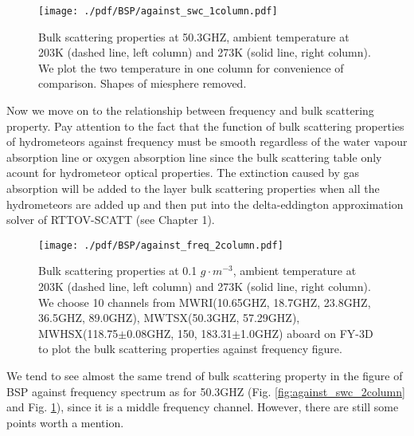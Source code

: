 \documentclass[a4paper]{report}
\begin{document}
\begin{figure}[hbtp] 
\centering
\texttt{[image: ./pdf/BSP/against\_swc\_1column.pdf]}
\caption{Bulk scattering properties at 50.3GHZ, ambient temperature at 203K (dashed line, left column) and 273K (solid line, right column).
We plot the two temperature in one column for convenience of comparison. Shapes of miesphere removed.}
\label{fig:against_swc_1column}
\end{figure}


Now we move on to the relationship between frequency and bulk scattering property. Pay attention to the fact that the function of bulk scattering properties 
of hydrometeors against frequency must be smooth regardless of the water vapour absorption line or oxygen absorption line
since the bulk scattering table only acount for hydrometeor optical properties. The extinction caused by gas absorption will be added to the layer bulk scattering properties
when all the hydrometeors are added up and then put into the delta-eddington approximation solver of RTTOV-SCATT (see Chapter 1).   

\begin{figure}[hbtp] 
\centering
\texttt{[image: ./pdf/BSP/against\_freq\_2column.pdf]}
\caption{Bulk scattering properties at 0.1 $g \cdot m^{-3}$, ambient temperature at 203K (dashed line, left column) and 273K (solid line, right column).
We choose 10 channels from MWRI(10.65GHZ, 18.7GHZ, 23.8GHZ, 36.5GHZ, 89.0GHZ), MWTSX(50.3GHZ, 57.29GHZ), MWHSX(118.75$\pm$0.08GHZ, 150, 183.31$\pm$1.0GHZ) aboard on FY-3D
to plot the bulk scattering properties against frequency figure.}
\label{fig:against_freq_2column}
\end{figure}

We tend to see almost the same trend of bulk scattering property in the figure of BSP against frequency spectrum as for 50.3GHZ (Fig. \ref{fig:against_swc_2column} and 
Fig. \ref{fig:against_swc_1column}), since it is a middle frequency channel.
However, there are still some points worth a mention. 
\end{document}
